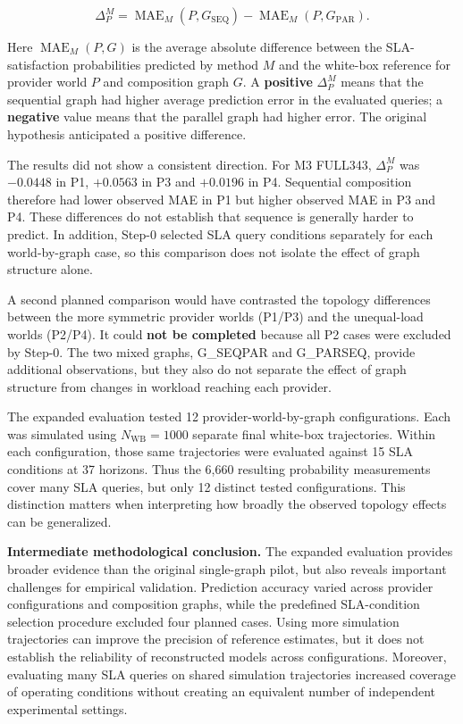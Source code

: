 \documentclass[10pt,a4paper]{article}
\begin{document}
\begin{equation*}
\Delta_P^M =
\operatorname{MAE}_M(P,G_{\mathrm{SEQ}})
-
\operatorname{MAE}_M(P,G_{\mathrm{PAR}}).
\tag{17}
\end{equation*}

Here $\operatorname{MAE}_M(P,G)$ is the average absolute difference between the SLA-satisfaction probabilities predicted by method $M$ and the white-box reference for provider world $P$ and composition graph $G$. A \textbf{positive} $\Delta_P^M$ means that the sequential graph had higher average prediction error in the evaluated queries; a \textbf{negative} value means that the parallel graph had higher error. The original hypothesis anticipated a positive difference.

The results did not show a consistent direction. For M3 FULL343, $\Delta_P^M$ was $-0.0448$ in P1, $+0.0563$ in P3 and $+0.0196$ in P4. Sequential composition therefore had lower observed MAE in P1 but higher observed MAE in P3 and P4. These differences do not establish that sequence is generally harder to predict. In addition, Step-0 selected SLA query conditions separately for each world-by-graph case, so this comparison does not isolate the effect of graph structure alone.

A second planned comparison would have contrasted the topology differences between the more symmetric provider worlds (P1/P3) and the unequal-load worlds (P2/P4). It could \textbf{not be completed} because all P2 cases were excluded by Step-0. The two mixed graphs, G\_SEQPAR and G\_PARSEQ, provide additional observations, but they also do not separate the effect of graph structure from changes in workload reaching each provider.

The expanded evaluation tested 12 provider-world-by-graph configurations. Each was simulated using $N_{\mathrm{WB}}=1000$ separate final white-box trajectories. Within each configuration, those same trajectories were evaluated against 15 SLA conditions at 37 horizons. Thus the 6,660 resulting probability measurements cover many SLA queries, but only 12 distinct tested configurations. This distinction matters when interpreting how broadly the observed topology effects can be generalized.

\textbf{Intermediate methodological conclusion.} The expanded evaluation provides broader evidence than the original single-graph pilot, but also reveals important challenges for empirical validation. Prediction accuracy varied across provider configurations and composition graphs, while the predefined SLA-condition selection procedure excluded four planned cases. Using more simulation trajectories can improve the precision of reference estimates, but it does not establish the reliability of reconstructed models across configurations. Moreover, evaluating many SLA queries on shared simulation trajectories increased coverage of operating conditions without creating an equivalent number of independent experimental settings.
\end{document}
